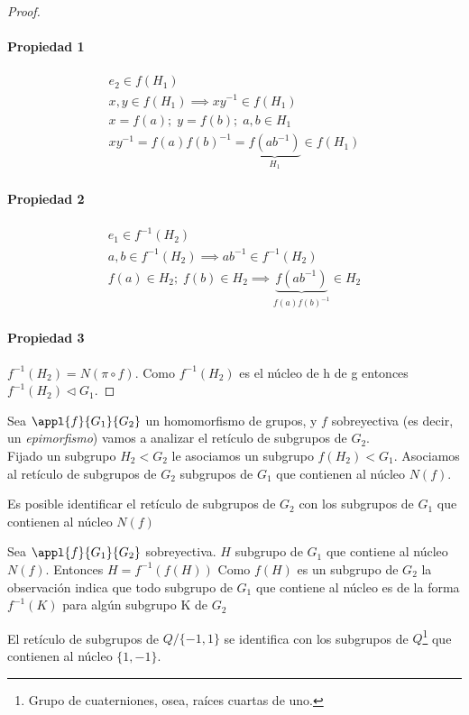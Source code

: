 \documentclass{apuntes}
\begin{document}
\begin{proof}
\paragraph{Propiedad 1}
\begin{gather*}
e_2 \in f(H_1)\\
x, y\in f(H_1) \implies xy^{-1}\in f(H_1)\\
x=f(a);\; y = f(b);\; a, b\in H_1\\
xy^{-1}=f(a)f(b)^{-1} = \underbrace{f(ab^{-1})}_{H_1} \in f(H_1)
\end{gather*}

\paragraph{Propiedad 2}
\begin{gather*}
e_1 \in f^{-1}(H_2)\\
a, b \in f^{-1}(H_2) \implies ab^{-1} \in f^{-1}(H_2)\\
f(a) \in H_2;\; f(b) \in H_2 \implies \underbrace{f(ab^{-1})}_{f(a)f(b)^{-1}}\in H_2
\end{gather*}

\paragraph{Propiedad 3}
$f^{-1}(H_2) = N(\pi \circ f)$. Como $f^{-1}(H_2)$ es el núcleo de h de g entonces $f^{-1}(H_2)\lhd G_1$.
\end{proof}


Sea $\appl{f}{G_1}{G_2}$ un homomorfismo de grupos, y $f$ sobreyectiva (es decir, un \textit{epimorfismo})
vamos a analizar el retículo de subgrupos de $G_2$.\\
Fijado un subgrupo $H_2<G_2$ le asociamos un subgrupo $f(H_2)<G_1$. Asociamos al retículo de subgrupos de $G_2$ subgrupos de $G_1$ que contienen al núcleo $N(f)$.
\begin{theorem}
Es posible identificar el retículo de subgrupos de $G_2$ con los subgrupos de $G_1$ que contienen al núcleo $N(f)$
\end{theorem}

\obs Sea $\appl{f}{G_1}{G_2}$ sobreyectiva. $H$ subgrupo de $G_1$ que contiene al núcleo $N(f)$. Entonces $H = f^{-1}(f(H))$
Como $f(H)$ es un subgrupo de $G_2$ la observación indica que todo subgrupo de $G_1$ que contiene al núcleo es de la forma $f^{-1}(K)$ para algún subgrupo K de $G_2$

\begin{example}
El retículo de subgrupos de $Q/{\{ -1, 1 \} }$ se identifica con los subgrupos de $Q$\footnote{Grupo de cuaterniones, osea, raíces cuartas de uno.} que contienen al núcleo $\{ 1, -1\} $.
\end{example}
\end{document}
